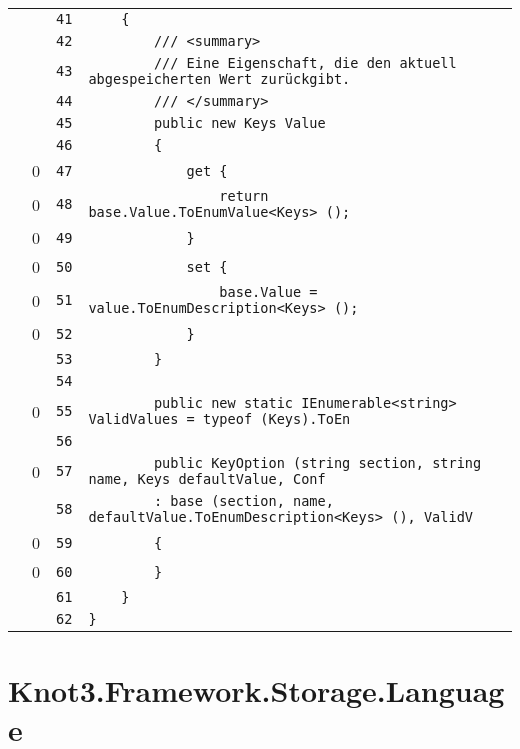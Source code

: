 \documentclass[a4paper,10pt]{article}
\begin{document}
\begin{longtable}[l]{lrrl}
\cellcolor{gray} &  & \verb~41~ & \verb~    {~\\
\cellcolor{gray} &  & \verb~42~ & \verb~        /// <summary>~\\
\cellcolor{gray} &  & \verb~43~ & \verb~        /// Eine Eigenschaft, die den aktuell abgespeicherten Wert zurückgibt.~\\
\cellcolor{gray} &  & \verb~44~ & \verb~        /// </summary>~\\
\cellcolor{gray} &  & \verb~45~ & \verb~        public new Keys Value~\\
\cellcolor{gray} &  & \verb~46~ & \verb~        {~\\
\cellcolor{red} & 0 & \verb~47~ & \verb~            get {~\\
\cellcolor{red} & 0 & \verb~48~ & \verb~                return base.Value.ToEnumValue<Keys> ();~\\
\cellcolor{red} & 0 & \verb~49~ & \verb~            }~\\
\cellcolor{red} & 0 & \verb~50~ & \verb~            set {~\\
\cellcolor{red} & 0 & \verb~51~ & \verb~                base.Value = value.ToEnumDescription<Keys> ();~\\
\cellcolor{red} & 0 & \verb~52~ & \verb~            }~\\
\cellcolor{gray} &  & \verb~53~ & \verb~        }~\\
\cellcolor{gray} &  & \verb~54~ & \verb~~\\
\cellcolor{red} & 0 & \verb~55~ & \verb~        public new static IEnumerable<string> ValidValues = typeof (Keys).ToEn~\\
\cellcolor{gray} &  & \verb~56~ & \verb~~\\
\cellcolor{red} & 0 & \verb~57~ & \verb~        public KeyOption (string section, string name, Keys defaultValue, Conf~\\
\cellcolor{gray} &  & \verb~58~ & \verb~        : base (section, name, defaultValue.ToEnumDescription<Keys> (), ValidV~\\
\cellcolor{red} & 0 & \verb~59~ & \verb~        {~\\
\cellcolor{red} & 0 & \verb~60~ & \verb~        }~\\
\cellcolor{gray} &  & \verb~61~ & \verb~    }~\\
\cellcolor{gray} &  & \verb~62~ & \verb~}~\\
\end{longtable}
\newpage
\section{Knot3.Framework.Storage.Language}
\end{document}
